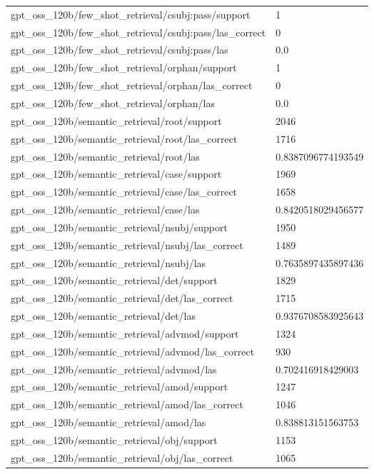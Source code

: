 \begin{tabular}{ll}
gpt\_oss\_120b/few\_shot\_retrieval/csubj:pass/support & 1 \\
gpt\_oss\_120b/few\_shot\_retrieval/csubj:pass/las\_correct & 0 \\
gpt\_oss\_120b/few\_shot\_retrieval/csubj:pass/las & 0.0 \\
gpt\_oss\_120b/few\_shot\_retrieval/orphan/support & 1 \\
gpt\_oss\_120b/few\_shot\_retrieval/orphan/las\_correct & 0 \\
gpt\_oss\_120b/few\_shot\_retrieval/orphan/las & 0.0 \\
gpt\_oss\_120b/semantic\_retrieval/root/support & 2046 \\
gpt\_oss\_120b/semantic\_retrieval/root/las\_correct & 1716 \\
gpt\_oss\_120b/semantic\_retrieval/root/las & 0.8387096774193549 \\
gpt\_oss\_120b/semantic\_retrieval/case/support & 1969 \\
gpt\_oss\_120b/semantic\_retrieval/case/las\_correct & 1658 \\
gpt\_oss\_120b/semantic\_retrieval/case/las & 0.8420518029456577 \\
gpt\_oss\_120b/semantic\_retrieval/nsubj/support & 1950 \\
gpt\_oss\_120b/semantic\_retrieval/nsubj/las\_correct & 1489 \\
gpt\_oss\_120b/semantic\_retrieval/nsubj/las & 0.7635897435897436 \\
gpt\_oss\_120b/semantic\_retrieval/det/support & 1829 \\
gpt\_oss\_120b/semantic\_retrieval/det/las\_correct & 1715 \\
gpt\_oss\_120b/semantic\_retrieval/det/las & 0.9376708583925643 \\
gpt\_oss\_120b/semantic\_retrieval/advmod/support & 1324 \\
gpt\_oss\_120b/semantic\_retrieval/advmod/las\_correct & 930 \\
gpt\_oss\_120b/semantic\_retrieval/advmod/las & 0.702416918429003 \\
gpt\_oss\_120b/semantic\_retrieval/amod/support & 1247 \\
gpt\_oss\_120b/semantic\_retrieval/amod/las\_correct & 1046 \\
gpt\_oss\_120b/semantic\_retrieval/amod/las & 0.838813151563753 \\
gpt\_oss\_120b/semantic\_retrieval/obj/support & 1153 \\
gpt\_oss\_120b/semantic\_retrieval/obj/las\_correct & 1065 \\

\end{tabular}
